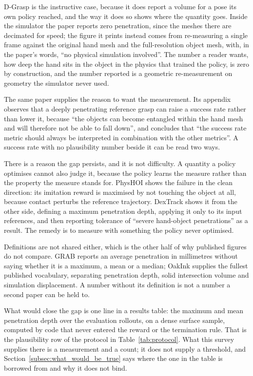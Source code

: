 D-Grasp \cite{dgrasp_2022} is the instructive case, because it does report a volume for a pose
its own policy reached, and the way it does so shows where the quantity goes. Inside the
simulator the paper reports zero penetration, since the meshes there are decimated for speed;
the figure it prints instead comes from re-measuring a single frame against the original hand
mesh and the full-resolution object mesh, with, in the paper's words, ``no physical simulation
involved''. The number a reader wants, how deep the hand sits in the object in the physics that
trained the policy, is zero by construction, and the number reported is a geometric
re-measurement on geometry the simulator never used.

The same paper supplies the reason to want the measurement. Its appendix observes that a deeply
penetrating reference grasp can raise a success rate rather than lower it, because ``the objects
can become entangled within the hand mesh and will therefore not be able to fall down'', and
concludes that ``the success rate metric should always be interpreted in combination with the
other metrics''. A success rate with no plausibility number beside it can be read two ways.

There is a reason the gap persists, and it is not difficulty. A quantity a policy optimises
cannot also judge it, because the policy learns the measure rather than the property the measure
stands for. PhysHOI \cite{physhoi_2023} shows the failure in the clean direction: its imitation
reward is maximised by not touching the object at all, because contact perturbs the reference
trajectory. DexTrack \cite{dextrack_2025} shows it from the other side, defining a maximum
penetration depth, applying it only to its input references, and then reporting tolerance of
``severe hand-object penetrations'' as a result. The remedy is to measure with something the
policy never optimised.

Definitions are not shared either, which is the other half of why published figures do not
compare. GRAB \cite{grab_2020} reports an average penetration in millimetres without saying
whether it is a maximum, a mean or a median; OakInk \cite{oakink_2022} supplies the fullest
published vocabulary, separating penetration depth, solid intersection volume and simulation
displacement. A number without its definition is not a number a second paper can be held to.

What would close the gap is one line in a results table: the maximum and mean penetration depth
over the evaluation rollouts, on a dense surface sample, computed by code that never entered the
reward or the termination rule. That is the plausibility row of the protocol in
Table~\ref{tab:protocol}. What this survey supplies there is a measurement and a count; it does not
supply a threshold, and Section~\ref{subsec:what_would_be_true} says where the one in the table is
borrowed from and why it does not bind.

